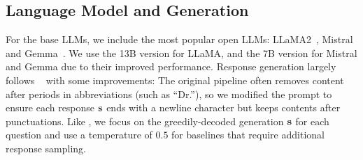 \subsection{Language Model and Generation}
For the base LLMs, we include the most popular open LLMs: LLaMA2~\citep{touvron2023llama2}, Mistral~\citep{jiang2023mistral} and Gemma~\citep{team2024gemma}.
We use the 13B version for LLaMA, and the 7B version for Mistral and Gemma due to their improved performance.
Response generation largely follows ~\citet{kuhn2023semantic} with some improvements: The original pipeline often removes content after periods in abbreviations (such as ``Dr.''), so we modified the prompt to ensure each response $\mathbf{s}$ ends with a newline character but keeps contents after punctuations.
Like \citet{kuhn2023semantic}, we focus on the greedily-decoded generation $\mathbf{s}$ for each question and use a temperature of $0.5$ for baselines that require additional response sampling. %




